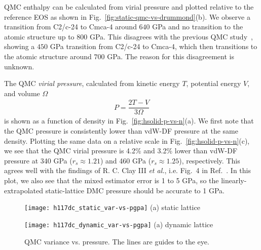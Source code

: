 QMC enthalpy can be calculated from virial pressure and plotted relative to the reference EOS as shown in Fig.~\ref{fig:static-qmc-vs-drummond}(b). We observe a transition from C2/c-24 to Cmca-4 around $640$ GPa and no transition to the atomic structure up to $800$ GPa.
This disagrees with the previous QMC study~\cite{McMinis2015}, showing a $450$ GPa transition from C2/c-24 to Cmca-4, which then transitions to the atomic structure around $700$ GPa.
The reason for this disagreement is unknown.

The QMC \emph{virial pressure}, calculated from kinetic energy $T$, potential energy $V$, and volume $\Omega$
\begin{align}
P = \dfrac{2T-V}{3\Omega}
\end{align}
is shown as a function of density in Fig.~\ref{fig:hsolid-p-vs-n}(a).
We first note that the QMC pressure is consistently lower than vdW-DF pressure at the same density.
Plotting the same data on a relative scale in Fig.~\ref{fig:hsolid-p-vs-n}(c),
we see that the QMC virial pressure is 4.2\% and 3.2\% lower than vdW-DF pressure at 340 GPa ($r_s\approx 1.21$) and 460 GPa ($r_s\approx 1.25$), respectively. This agrees well with the findings of R. C. Clay III \textit{et al.}, i.e. Fig.~4 in Ref.~\cite{Clay2016}.
In this plot, we also see that the mixed estimator error is 1 to 5 GPa, so the linearly-extrapolated static-lattice DMC pressure should be accurate to 1 GPa.

\begin{figure}[ht]
\centering
\begin{minipage}{0.49\linewidth}
\centering
\texttt{[image: h117dc\_static\_var-vs-pgpa]}
(a) static lattice
\end{minipage}
\centering
\begin{minipage}{0.49\linewidth}
\centering
\texttt{[image: h117dc\_dynamic\_var-vs-pgpa]}
(a) dynamic lattice
\end{minipage}
\caption{QMC variance vs. pressure. The lines are guides to the eye.}
\label{fig:hsolid-v-vs-p}
\end{figure}

